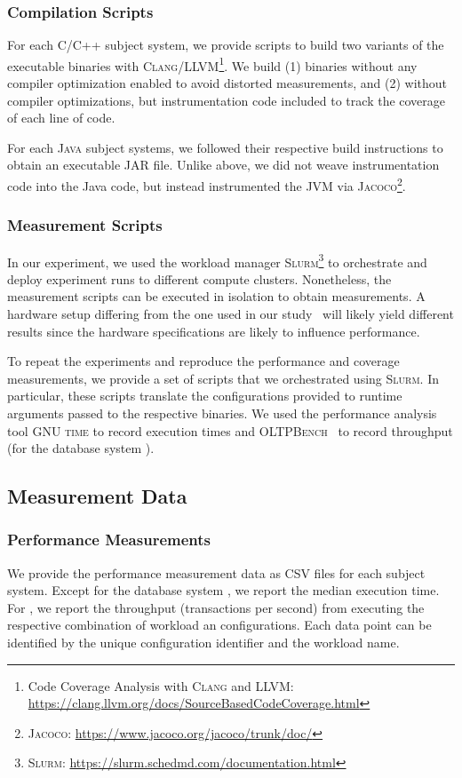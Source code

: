 {%
\subsubsection{Compilation Scripts} For each \textsc{C/C++} subject system, we provide scripts to build two variants of the executable binaries with \textsc{Clang/LLVM}\footnote{Code Coverage Analysis with \textsc{Clang} and \textsc{LLVM}: \url{https://clang.llvm.org/docs/SourceBasedCodeCoverage.html}}. We build (1) binaries without any compiler optimization enabled to avoid distorted measurements, and (2) without compiler optimizations, but instrumentation code included to track the coverage of each line of code. 

For each \textsc{Java} subject systems, we followed their respective build instructions to obtain an executable JAR file. Unlike above, we did not weave instrumentation code into the Java code, but instead instrumented the JVM via \textsc{Jacoco}\footnote{\textsc{Jacoco}: \url{https://www.jacoco.org/jacoco/trunk/doc/}}.

\subsubsection{Measurement Scripts} In our experiment, we used the workload manager \textsc{Slurm}\footnote{\textsc{Slurm}: \url{https://slurm.schedmd.com/documentation.html}} to orchestrate and deploy experiment runs to different compute clusters. Nonetheless, the measurement scripts can be executed in isolation to obtain measurements. A hardware setup differing from the one used in our study~\cite{muhlbauer_workload_2023} will likely yield different results since the hardware specifications are likely to influence performance. 

To repeat the experiments and reproduce the performance and coverage measurements, we provide a set of scripts that we orchestrated using \textsc{Slurm}. In particular, these scripts translate the configurations provided to runtime arguments passed to the respective binaries. We used the performance analysis tool \textsc{GNU time} to record execution times and \textsc{OLTPBench}~\cite{difallah_oltp_2013} to record throughput (for the database system \htwo).


\subsection{Measurement Data}
\subsubsection{Performance Measurements} 
We provide the performance measurement data as CSV files for each subject system. Except for the database system \htwo, we report the median execution time. For \htwo, we report the throughput (transactions per second) from executing the respective combination of workload an configurations. Each data point can be identified by the unique configuration identifier and the workload name.

}
